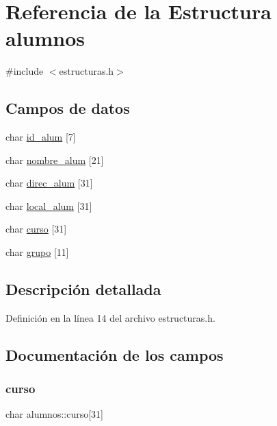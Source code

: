 \hypertarget{structalumnos}{}\section{Referencia de la Estructura alumnos}
\label{structalumnos}


{\ttfamily \#include $<$estructuras.\+h$>$}

\subsection*{Campos de datos}
\begin{DoxyCompactItemize}
\item 
char \mbox{\hyperlink{structalumnos_a960ce04015926176477962a5c4199290}{id\+\_\+alum}} \mbox{[}7\mbox{]}
\item 
char \mbox{\hyperlink{structalumnos_a99ddf967c6149106fcdd8d74064dec00}{nombre\+\_\+alum}} \mbox{[}21\mbox{]}
\item 
char \mbox{\hyperlink{structalumnos_aa02cb94abeb6fd35003b880da9e41899}{direc\+\_\+alum}} \mbox{[}31\mbox{]}
\item 
char \mbox{\hyperlink{structalumnos_ac07a90b981cceea8fc4bf627f4126c19}{local\+\_\+alum}} \mbox{[}31\mbox{]}
\item 
char \mbox{\hyperlink{structalumnos_a5cdacbd8eecf8fe90d08936865c1ccf6}{curso}} \mbox{[}31\mbox{]}
\item 
char \mbox{\hyperlink{structalumnos_a1100c8a658fcb00dd7b0a057b1cd0c09}{grupo}} \mbox{[}11\mbox{]}
\end{DoxyCompactItemize}


\subsection{Descripción detallada}


Definición en la línea 14 del archivo estructuras.\+h.



\subsection{Documentación de los campos}
\mbox{\label{structalumnos_a5cdacbd8eecf8fe90d08936865c1ccf6}} 
\subsubsection{\texorpdfstring{curso}{curso}}
{\footnotesize\ttfamily char alumnos\+::curso\mbox{[}31\mbox{]}}



